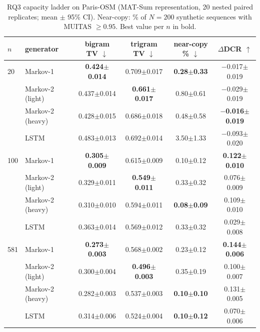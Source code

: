\begin{table}[!t]
\caption{RQ3 capacity ladder on Paris-OSM (MAT-Sum representation, 20 nested paired replicates; mean $\pm$ 95\% CI). Near-copy: \% of $N{=}200$ synthetic sequences with MUITAS $\ge 0.95$. Best value per $n$ in bold.}
\label{tab:order2}
\centering
\small
\begin{tabular}{llcccc}
\toprule
$n$ & generator & bigram TV $\downarrow$ & trigram TV $\downarrow$ & near-copy \% $\downarrow$ & $\Delta$DCR $\uparrow$ \\
\midrule
20 & Markov-1 & \textbf{0.424$\pm$0.014} & 0.709$\pm$0.017 & \textbf{0.28$\pm$0.33} & $-$0.017$\pm$0.019 \\
 & Markov-2 (light) & 0.437$\pm$0.014 & \textbf{0.661$\pm$0.017} & 0.80$\pm$0.61 & $-$0.029$\pm$0.019 \\
 & Markov-2 (heavy) & 0.428$\pm$0.015 & 0.686$\pm$0.018 & 0.48$\pm$0.58 & \textbf{$-$0.016$\pm$0.019} \\
 & LSTM & 0.483$\pm$0.013 & 0.692$\pm$0.014 & 3.50$\pm$1.33 & $-$0.093$\pm$0.020 \\
\midrule
100 & Markov-1 & \textbf{0.305$\pm$0.009} & 0.615$\pm$0.009 & 0.10$\pm$0.12 & \textbf{0.122$\pm$0.010} \\
 & Markov-2 (light) & 0.329$\pm$0.011 & \textbf{0.549$\pm$0.011} & 0.33$\pm$0.32 & 0.076$\pm$0.009 \\
 & Markov-2 (heavy) & 0.310$\pm$0.010 & 0.594$\pm$0.011 & \textbf{0.08$\pm$0.09} & 0.109$\pm$0.010 \\
 & LSTM & 0.363$\pm$0.014 & 0.569$\pm$0.012 & 0.33$\pm$0.32 & 0.029$\pm$0.008 \\
\midrule
581 & Markov-1 & \textbf{0.273$\pm$0.003} & 0.568$\pm$0.002 & 0.23$\pm$0.12 & \textbf{0.144$\pm$0.006} \\
 & Markov-2 (light) & 0.300$\pm$0.004 & \textbf{0.496$\pm$0.003} & 0.35$\pm$0.19 & 0.100$\pm$0.007 \\
 & Markov-2 (heavy) & 0.282$\pm$0.003 & 0.537$\pm$0.003 & \textbf{0.10$\pm$0.10} & 0.131$\pm$0.005 \\
 & LSTM & 0.314$\pm$0.006 & 0.524$\pm$0.004 & \textbf{0.10$\pm$0.12} & 0.070$\pm$0.006 \\
\bottomrule
\end{tabular}
\end{table}